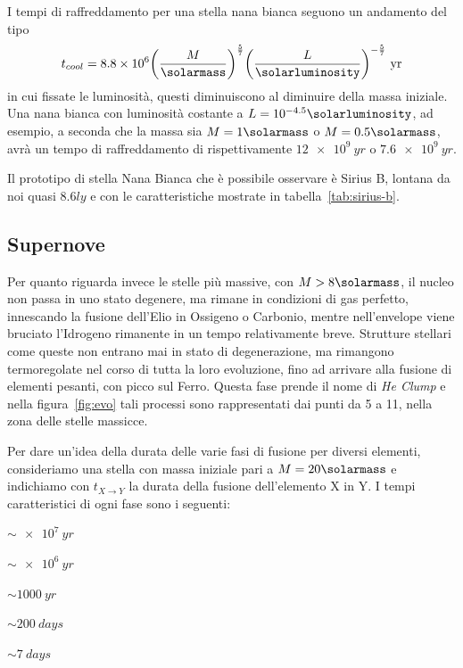 I tempi di raffreddamento per una stella nana bianca seguono un andamento del tipo
\begin{equation}
    t_{cool} = 8.8\times 10^6 {\left(\frac{M}{\si{\solarmass}} \right)}^{\frac{5}{7}} {\left( \frac{L}{\si{\solarluminosity}} \right)}^{-\frac{5}{7}} \mbox{ yr}
\end{equation}
in cui fissate le luminosità, questi diminuiscono al diminuire della massa iniziale. Una nana bianca con luminosità costante a $L = 10^{-4.5} \si{\solarluminosity}$, ad esempio, a seconda che la massa sia $M = 1\si{\solarmass}$ o $M = 0.5 \si{\solarmass}$, avrà un tempo di raffreddamento di rispettivamente $\SI{12e9}{yr}$ o $\SI{7.6e9}{yr}$.

Il prototipo di stella Nana Bianca che è possibile osservare è Sirius B, lontana da noi quasi $8.6 \si{ly}$ e con le caratteristiche mostrate in tabella~\ref{tab:sirius-b}.

\subsection{Supernove}\label{sec:supernove}
Per quanto riguarda invece le stelle più massive, con $M > 8 \si{\solarmass}$, il nucleo non passa in uno stato degenere, ma rimane in condizioni di gas perfetto, innescando la fusione dell'Elio in Ossigeno o Carbonio, mentre nell'envelope viene bruciato l'Idrogeno rimanente in un tempo relativamente breve. Strutture stellari come queste non entrano mai in stato di degenerazione, ma rimangono termoregolate nel corso di tutta la loro evoluzione, fino ad arrivare alla fusione di elementi pesanti, con picco sul Ferro. Questa fase prende il nome di \textit{He Clump} e nella figura~\ref{fig:evo} tali processi sono rappresentati dai punti da 5 a 11, nella zona delle stelle massicce.

Per dare un'idea della durata delle varie fasi di fusione per diversi elementi, consideriamo una stella con massa iniziale pari a $M = 20\si{\solarmass}$ e indichiamo con $t_{X \rightarrow Y}$ la durata della fusione dell'elemento X in Y. I tempi caratteristici di ogni fase sono i seguenti:
\begin{description}
    \centering
    \item[$t_{H \rightarrow He}$] $\sim \SI{e7}{yr}$
    \item[$t_{He \rightarrow C}$] $\sim \SI{e6}{yr}$
    \item[$t_{C \rightarrow O}$] $\sim \SI{1000}{yr}$
    \item[$t_{O}$] $\sim \SI{200}{days}$
    \item[$t_{Si}$] $\sim \SI{7}{days}$
\end{description}


